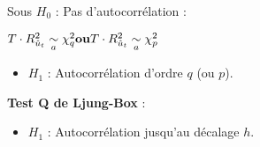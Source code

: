 \begin{f}[Détection]
\begin{itemize}[leftmargin=*]
Sous \(H_{0}\) : Pas d'autocorrélation :

\begin {center}
\(\hfill T \cdot R^{2}_{\hat{u}_t}\underset{a}{\sim}\chi^{2}_{q} \hfill \textbf{ou} \hfill T \cdot R^{2}_{\hat{u}_t}\underset{a}{\sim}\chi^{2}_{p} \hfill\)
\end{center}

\begin{itemize}[leftmargin=*]
\item \(H_{1}\) : Autocorrélation d'ordre \(q\) (ou \(p\)).
\end{itemize}

\textbf{Test Q de Ljung-Box} :

\begin{itemize}[leftmargin=*]
\item \(H_{1}\) : Autocorrélation jusqu'au décalage \(h\).
\end{itemize}

\end{itemize}



\end{f}  

